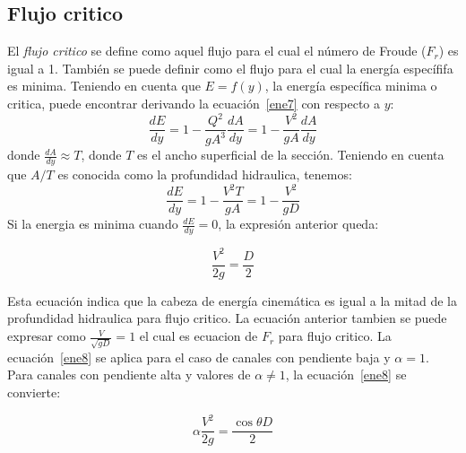 \documentclass[11pt, oneside]{article}
\begin{document}
\subsection{Flujo critico}
El \emph{flujo critico} se define como aquel flujo para el cual el n\'umero de Froude ($F_r$) es igual a 1. Tambi\'en se puede definir como el flujo para el cual la energ\'ia espec\'ififa es minima. Teniendo en cuenta que $E=f(y)$, la energ\'ia espec\'ifica minima o critica, puede encontrar derivando la ecuaci\'on~\ref{ene7} con respecto a $y$:
$$
\frac{dE}{dy} = 1 - \frac{Q^2}{gA^3} \frac{dA}{dy} = 1 - \frac{V^2}{gA} \frac{dA}{dy}
$$
donde $\frac{dA}{dy} \approx T$, donde $T$ es el ancho superficial de la secci\'on. Teniendo en cuenta que $A/T$ es conocida como la profundidad hidraulica, tenemos:
$$
\frac{dE}{dy} = 1 -  \frac{V^2 T}{gA} = 1 -  \frac{V^2}{gD} 
$$
Si la energia es minima cuando  $\frac{dE}{dy}=0$, la expresi\'on anterior queda:

\begin{equation}
\frac{V^2}{2g} = \frac{D}{2} 
\label{ene8}
\end{equation}

Esta ecuaci\'on indica que la cabeza de energ\'ia cinem\'atica es igual a la mitad de la profundidad hidraulica para flujo critico. La ecuaci\'on anterior tambien se puede expresar como $\frac{V}{\sqrt{gD}}=1$ el cual es ecuacion de $F_r$ para flujo critico. La ecuaci\'on~\ref{ene8} se aplica para el caso de canales con pendiente baja y $\alpha = 1$. Para canales con pendiente alta y valores de $\alpha \ne 1$, la ecuaci\'on~\ref{ene8} se convierte:

\begin{equation}
\alpha \frac{V^2}{2g} = \frac{\cos \theta D}{2} 
\label{ene9}
\end{equation}
\end{document}
